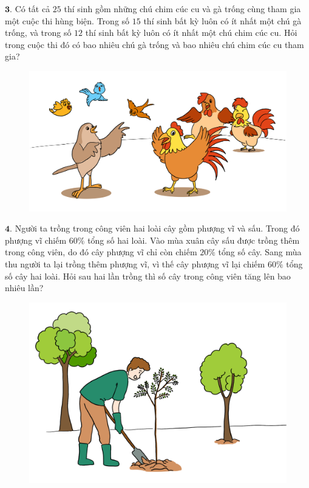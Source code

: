 \begin{multicols}{2}
\begin{figure}[H]
		\vspace*{-5pt}
	\end{figure}
	$\pmb{3.}$ 	Có tất cả $25$ thí sinh gồm những chú chim cúc cu và gà trống cùng tham gia một cuộc thi hùng biện. Trong số $15$ thí sinh bất kỳ luôn có ít nhất một chú gà trống, và trong số $12$ thí sinh bất kỳ luôn có ít nhất một chú chim cúc cu. Hỏi trong cuộc thi đó có bao nhiêu chú gà trống và bao nhiêu chú chim cúc cu tham gia?
	\begin{figure}[H]
		\centering
		\vspace*{-5pt}
		\captionsetup{labelformat= empty, justification=centering}
		\includegraphics[width=1\linewidth]{Pi6_bai3}
		\vspace*{-10pt}
	\end{figure}
	$\pmb{4.}$ Người ta trồng trong công viên hai loài cây gồm phượng vĩ và sấu. Trong đó phượng vĩ chiếm $60\%$ tổng số hai loài. Vào mùa xuân cây sấu được trồng thêm trong công viên, do đó cây phượng vĩ chỉ còn chiếm $20\%$ tổng số cây. Sang mùa thu người ta lại trồng thêm  phượng vĩ, vì thế cây phượng vĩ lại chiếm $60\%$ tổng số cây hai loài. Hỏi sau hai lần trồng thì số cây trong công viên tăng lên bao nhiêu lần?
	\begin{figure}[H]
		\centering
		\vspace*{-5pt}
		\captionsetup{labelformat= empty, justification=centering}
		\includegraphics[width=1\linewidth]{Pi6_bai4}

\end{figure}
\end{multicols}
